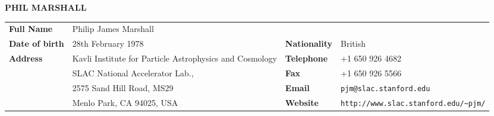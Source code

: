 \begin{center}
{\bf \Large P{\large HIL} M{\large ARSHALL}}
\end{center}

\vspace{\baselineskip}

\begin{raggedright}
\begin{tabular}{@{}p{2.3cm}p{6.0cm}p{2.0cm}p{5.2cm}}
\textbf{Full Name}      & Philip James Marshall           & & \\
\textbf{Date of birth}  & 28th February 1978              & \textbf{Nationality}  & British \\
\textbf{Address}        & Kavli Institute for Particle Astrophysics and Cosmology            & \textbf{Telephone} & +1 650 926 4682 \\
                        & SLAC National Accelerator Lab., & \textbf{Fax}       & +1 650 926 5566 \\
                        & 2575 Sand Hill Road, MS29       & \textbf{Email}     & \texttt{pjm@slac.stanford.edu} \\
                        & Menlo Park, CA 94025, USA       & \textbf{Website}   & \verb+http://www.slac.stanford.edu/~pjm/+
\end{tabular}
\end{raggedright}
